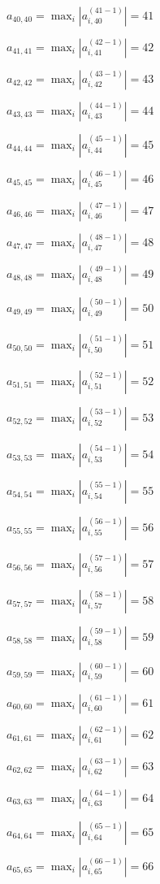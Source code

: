 \documentclass[a4paper,12pt]{article}
\begin{document}
$a _{ 40, 40 } =  \max _i |a _{ i, 40 } ^{ (41 - 1) } | = 41$

$a _{ 41, 41 } =  \max _i |a _{ i, 41 } ^{ (42 - 1) } | = 42$

$a _{ 42, 42 } =  \max _i |a _{ i, 42 } ^{ (43 - 1) } | = 43$

$a _{ 43, 43 } =  \max _i |a _{ i, 43 } ^{ (44 - 1) } | = 44$

$a _{ 44, 44 } =  \max _i |a _{ i, 44 } ^{ (45 - 1) } | = 45$

$a _{ 45, 45 } =  \max _i |a _{ i, 45 } ^{ (46 - 1) } | = 46$

$a _{ 46, 46 } =  \max _i |a _{ i, 46 } ^{ (47 - 1) } | = 47$

$a _{ 47, 47 } =  \max _i |a _{ i, 47 } ^{ (48 - 1) } | = 48$

$a _{ 48, 48 } =  \max _i |a _{ i, 48 } ^{ (49 - 1) } | = 49$

$a _{ 49, 49 } =  \max _i |a _{ i, 49 } ^{ (50 - 1) } | = 50$

$a _{ 50, 50 } =  \max _i |a _{ i, 50 } ^{ (51 - 1) } | = 51$

$a _{ 51, 51 } =  \max _i |a _{ i, 51 } ^{ (52 - 1) } | = 52$

$a _{ 52, 52 } =  \max _i |a _{ i, 52 } ^{ (53 - 1) } | = 53$

$a _{ 53, 53 } =  \max _i |a _{ i, 53 } ^{ (54 - 1) } | = 54$

$a _{ 54, 54 } =  \max _i |a _{ i, 54 } ^{ (55 - 1) } | = 55$

$a _{ 55, 55 } =  \max _i |a _{ i, 55 } ^{ (56 - 1) } | = 56$

$a _{ 56, 56 } =  \max _i |a _{ i, 56 } ^{ (57 - 1) } | = 57$

$a _{ 57, 57 } =  \max _i |a _{ i, 57 } ^{ (58 - 1) } | = 58$

$a _{ 58, 58 } =  \max _i |a _{ i, 58 } ^{ (59 - 1) } | = 59$

$a _{ 59, 59 } =  \max _i |a _{ i, 59 } ^{ (60 - 1) } | = 60$

$a _{ 60, 60 } =  \max _i |a _{ i, 60 } ^{ (61 - 1) } | = 61$

$a _{ 61, 61 } =  \max _i |a _{ i, 61 } ^{ (62 - 1) } | = 62$

$a _{ 62, 62 } =  \max _i |a _{ i, 62 } ^{ (63 - 1) } | = 63$

$a _{ 63, 63 } =  \max _i |a _{ i, 63 } ^{ (64 - 1) } | = 64$

$a _{ 64, 64 } =  \max _i |a _{ i, 64 } ^{ (65 - 1) } | = 65$

$a _{ 65, 65 } =  \max _i |a _{ i, 65 } ^{ (66 - 1) } | = 66$
\end{document}
